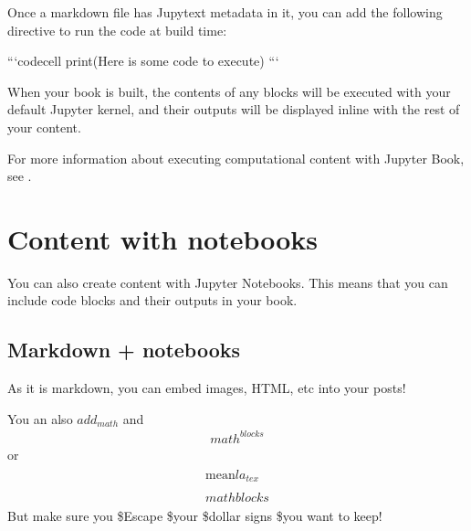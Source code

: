 \documentclass[letterpaper,10pt,english]{sphinxmanual}
\begin{document}
Once a markdown file has Jupytext metadata in it, you can add the following
directive to run the code at build time:

\begin{sphinxVerbatim}[commandchars=\\\{\}]
```\PYGZob{}code\PYGZhy{}cell\PYGZcb{}
print(\PYGZdq{}Here is some code to execute\PYGZdq{})
```
\end{sphinxVerbatim}

When your book is built, the contents of any  blocks will be
executed with your default Jupyter kernel, and their outputs will be displayed
in\sphinxhyphen{}line with the rest of your content.

For more information about executing computational content with Jupyter Book,
see .


\section{Content with notebooks}
\label{\detokenize{notebooks:content-with-notebooks}}\label{\detokenize{notebooks::doc}}
You can also create content with Jupyter Notebooks. This means that you can include
code blocks and their outputs in your book.


\subsection{Markdown + notebooks}
\label{\detokenize{notebooks:markdown-notebooks}}
As it is markdown, you can embed images, HTML, etc into your posts!


You an also \(add_{math}\) and
\begin{equation*}
\begin{split}
math^{blocks}
\end{split}
\end{equation*}
or
\begin{equation*}
\begin{split}
\begin{aligned}
\mbox{mean} la_{tex} \\ \\
math blocks
\end{aligned}
\end{split}
\end{equation*}
But make sure you \$Escape \$your \$dollar signs \$you want to keep!
\end{document}
